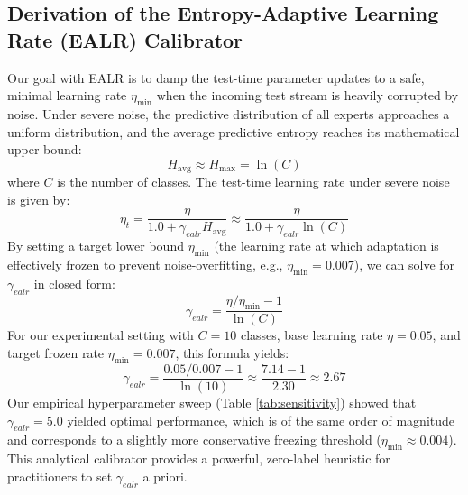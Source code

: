 \documentclass{article}
\theoremstyle{plain}
\theoremstyle{definition}
\theoremstyle{remark}
\begin{document}
\subsection{Derivation of the Entropy-Adaptive Learning Rate (EALR) Calibrator}
Our goal with EALR is to damp the test-time parameter updates to a safe, minimal learning rate $\eta_{\text{min}}$ when the incoming test stream is heavily corrupted by noise.
Under severe noise, the predictive distribution of all experts approaches a uniform distribution, and the average predictive entropy reaches its mathematical upper bound:
\begin{equation}
    H_{\text{avg}} \approx H_{\text{max}} = \ln(C)
\end{equation}
where $C$ is the number of classes.
The test-time learning rate under severe noise is given by:
\begin{equation}
    \eta_t = \frac{\eta}{1.0 + \gamma_{ealr} H_{\text{avg}}} \approx \frac{\eta}{1.0 + \gamma_{ealr} \ln(C)}
\end{equation}
By setting a target lower bound $\eta_{\text{min}}$ (the learning rate at which adaptation is effectively frozen to prevent noise-overfitting, e.g., $\eta_{\text{min}} = 0.007$), we can solve for $\gamma_{ealr}$ in closed form:
\begin{equation}
    \gamma_{ealr} = \frac{\eta / \eta_{\text{min}} - 1}{\ln(C)}
\end{equation}
For our experimental setting with $C = 10$ classes, base learning rate $\eta = 0.05$, and target frozen rate $\eta_{\text{min}} = 0.007$, this formula yields:
\begin{equation}
    \gamma_{ealr} = \frac{0.05 / 0.007 - 1}{\ln(10)} \approx \frac{7.14 - 1}{2.30} \approx 2.67
\end{equation}
Our empirical hyperparameter sweep (Table \ref{tab:sensitivity}) showed that $\gamma_{ealr} = 5.0$ yielded optimal performance, which is of the same order of magnitude and corresponds to a slightly more conservative freezing threshold ($\eta_{\text{min}} \approx 0.004$). This analytical calibrator provides a powerful, zero-label heuristic for practitioners to set $\gamma_{ealr}$ a priori.
\end{document}
